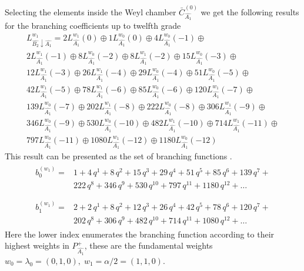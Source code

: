 \documentclass[a4paper,12pt]{article}
\theoremstyle{definition} \newtheorem{Def}{Definition}
\begin{document}
Selecting the elements inside the  Weyl chamber
$\bar{C}^{\left( 0 \right)}_{\hat{A_1}}$
we get the following results for the branching coefficients up to twelfth grade
\begin{multline}
  \label{eq:28}
  L^{w_1}_{\hat{B_2}\downarrow \hat{A_1}}=2 L_{\hat{A_1}}^{w_1}(0)\oplus 1 L_{\hat{A_1}}^{w_0}(0)\oplus 4 L_{\hat{A_1}}^{w_0}(-1)\oplus\\
    2 L_{\hat{A_1}}^{w_1}(-1)\oplus 8 L_{\hat{A_1}}^{w_0}(-2)\oplus
    8 L_{\hat{A_1}}^{w_1}(-2)\oplus 15 L_{\hat{A_1}}^{w_0}(-3)\oplus\\
    12 L_{\hat{A_1}}^{w_1}(-3)\oplus 26 L_{\hat{A_1}}^{w_1}(-4)\oplus
    29 L_{\hat{A_1}}^{w_0}(-4)\oplus 51 L_{\hat{A_1}}^{w_0}(-5)\oplus\\
    42 L_{\hat{A_1}}^{w_1}(-5)\oplus 78 L_{\hat{A_1}}^{w_1}(-6)\oplus
    85 L_{\hat{A_1}}^{w_0}(-6)\oplus 120 L_{\hat{A_1}}^{w_1}(-7)\oplus\\
    139 L_{\hat{A_1}}^{w_0}(-7)\oplus 202 L_{\hat{A_1}}^{w_1}(-8)\oplus
    222 L_{\hat{A_1}}^{w_0}(-8)\oplus 306 L_{\hat{A_1}}^{w_1}(-9)\oplus\\
    346 L_{\hat{A_1}}^{w_0}(-9)\oplus 530 L_{\hat{A_1}}^{w_0}(-10)\oplus
    482 L_{\hat{A_1}}^{w_1}(-10)\oplus 714 L_{\hat{A_1}}^{w_1}(-11)\oplus\\
    797 L_{\hat{A_1}}^{w_0}(-11)\oplus 1080 L_{\hat{A_1}}^{w_1}(-12)\oplus
    1180 L_{\hat{A_1}}^{w_0}(-12)
\end{multline}
This result can be presented as the set of branching functions \cite{kac1990idl}.
\begin{eqnarray}
  \label{eq:29}
  \begin{array}{cc}
    b^{(w_1)}_{0}= & 1 + 4\,q^{1}+ 8\,q^{2}+ 15\,q^{3}+ 29\,q^{4}+ 51\,q^{5}+ 85\,q^{6}+ 139\,q^{7}+\\
     &222\,q^{8}+ 346\,q^{9}+ 530\,q^{10}+ 797\,q^{11}+ 1180\,q^{12}+\dots\\
  \end{array}\\
  \begin{array}{cc}
    b^{(w_1)}_{1}= &2+2\,q^{1}+8\,q^{2}+12\,q^{3}+26\,q^{4}+42\,q^{5}+78\,q^{6}+120\,q^{7}+\\
    & 202\,q^{8}+306\,q^{9}+482\,q^{10}+714\,q^{11}+1080\,q^{12}+\dots
  \end{array}
\end{eqnarray}
Here the lower index enumerates the branching function according to their highest weights in $P^+_{\hat{A_1}}$, these are the fundamental weights $w_0=\lambda_0=(0,1,0),\; w_1=\alpha/2=(1,1,0)$.
\end{document}
